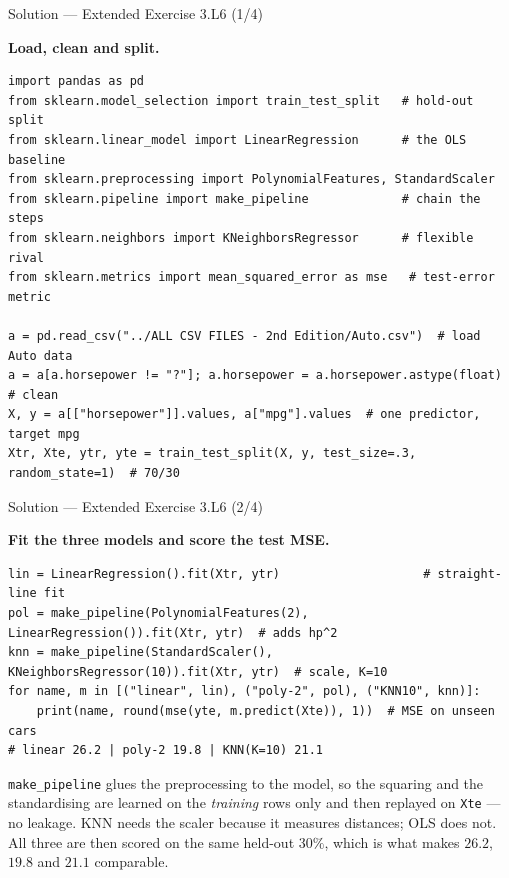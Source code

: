 \documentclass[aspectratio=169,11pt]{beamer}
\begin{document}
\begin{frame}[fragile]{Solution --- Extended Exercise 3.L6 (1/4)}
  \begin{solutionbox}
    \textbf{Load, clean and split.}
\begin{lstlisting}[basicstyle=\ttfamily\scriptsize]
import pandas as pd
from sklearn.model_selection import train_test_split   # hold-out split
from sklearn.linear_model import LinearRegression      # the OLS baseline
from sklearn.preprocessing import PolynomialFeatures, StandardScaler
from sklearn.pipeline import make_pipeline             # chain the steps
from sklearn.neighbors import KNeighborsRegressor      # flexible rival
from sklearn.metrics import mean_squared_error as mse   # test-error metric

a = pd.read_csv("../ALL CSV FILES - 2nd Edition/Auto.csv")  # load Auto data
a = a[a.horsepower != "?"]; a.horsepower = a.horsepower.astype(float)  # clean
X, y = a[["horsepower"]].values, a["mpg"].values  # one predictor, target mpg
Xtr, Xte, ytr, yte = train_test_split(X, y, test_size=.3, random_state=1)  # 70/30
\end{lstlisting}
  \end{solutionbox}
\end{frame}

\begin{frame}[fragile]{Solution --- Extended Exercise 3.L6 (2/4)}
  \begin{solutionbox}
    \textbf{Fit the three models and score the test MSE.}
\begin{lstlisting}[basicstyle=\ttfamily\scriptsize]
lin = LinearRegression().fit(Xtr, ytr)                    # straight-line fit
pol = make_pipeline(PolynomialFeatures(2), LinearRegression()).fit(Xtr, ytr)  # adds hp^2
knn = make_pipeline(StandardScaler(), KNeighborsRegressor(10)).fit(Xtr, ytr)  # scale, K=10
for name, m in [("linear", lin), ("poly-2", pol), ("KNN10", knn)]:
    print(name, round(mse(yte, m.predict(Xte)), 1))  # MSE on unseen cars
# linear 26.2 | poly-2 19.8 | KNN(K=10) 21.1
\end{lstlisting}
  \end{solutionbox}
  \begin{readme}\footnotesize
    \texttt{make\_pipeline} glues the preprocessing to the model, so the
    squaring and the standardising are learned on the \emph{training} rows
    only and then replayed on \texttt{Xte} --- no leakage. KNN needs the
    scaler because it measures distances; OLS does not. All three are then
    scored on the same held-out $30\%$, which is what makes $26.2$, $19.8$
    and $21.1$ comparable.
  \end{readme}
\end{frame}
\end{document}
